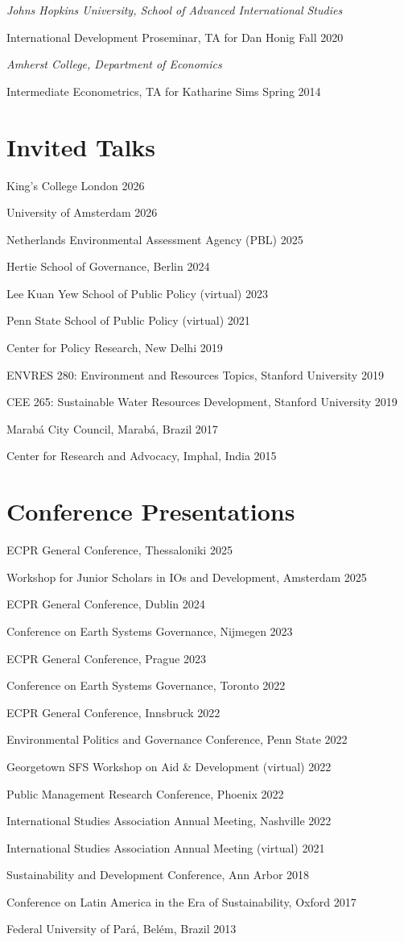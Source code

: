 \documentclass[11pt, letterpaper]{article}
\newcommand{\cventry}[2]{\noindent #1 \hfill #2\par}
\begin{document}
\vspace{0.8em}

\textit{Johns Hopkins University, School of Advanced International Studies}

\vspace{0.3em}

\cventry{International Development Proseminar, TA for Dan Honig}{Fall 2020}

\vspace{0.8em}

\textit{Amherst College, Department of Economics}

\vspace{0.3em}

\cventry{Intermediate Econometrics, TA for Katharine Sims}{Spring 2014}

\section{Invited Talks}

\cventry{King's College London}{2026}
\cventry{University of Amsterdam}{2026}
\cventry{Netherlands Environmental Assessment Agency (PBL)}{2025}
\cventry{Hertie School of Governance, Berlin}{2024}
\cventry{Lee Kuan Yew School of Public Policy (virtual)}{2023}
\cventry{Penn State School of Public Policy (virtual)}{2021}
\cventry{Center for Policy Research, New Delhi}{2019}
\cventry{ENVRES 280: Environment and Resources Topics, Stanford University}{2019}
\cventry{CEE 265: Sustainable Water Resources Development, Stanford University}{2019}
\cventry{Marab\'a City Council, Marab\'a, Brazil}{2017}
\cventry{Center for Research and Advocacy, Imphal, India}{2015}

\section{Conference Presentations}

\cventry{ECPR General Conference, Thessaloniki}{2025}
\cventry{Workshop for Junior Scholars in IOs and Development, Amsterdam}{2025}
\cventry{ECPR General Conference, Dublin}{2024}
\cventry{Conference on Earth Systems Governance, Nijmegen}{2023}
\cventry{ECPR General Conference, Prague}{2023}
\cventry{Conference on Earth Systems Governance, Toronto}{2022}
\cventry{ECPR General Conference, Innsbruck}{2022}
\cventry{Environmental Politics and Governance Conference, Penn State}{2022}
\cventry{Georgetown SFS Workshop on Aid \& Development (virtual)}{2022}
\cventry{Public Management Research Conference, Phoenix}{2022}
\cventry{International Studies Association Annual Meeting, Nashville}{2022}
\cventry{International Studies Association Annual Meeting (virtual)}{2021}
\cventry{Sustainability and Development Conference, Ann Arbor}{2018}
\cventry{Conference on Latin America in the Era of Sustainability, Oxford}{2017}
\cventry{Federal University of Par\'a, Bel\'em, Brazil}{2013}
\end{document}
